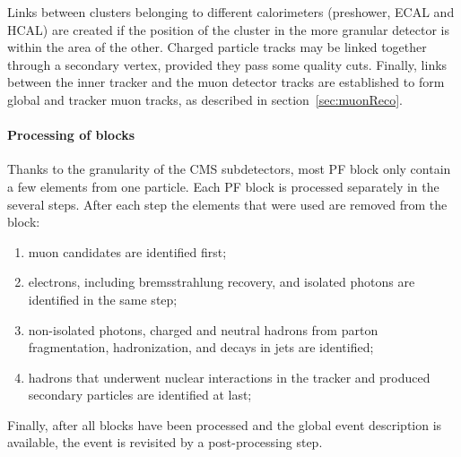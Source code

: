 Links between clusters belonging to different calorimeters (preshower, ECAL and HCAL) are created if the position of the cluster in the more granular detector is within the area of the other.
Charged particle tracks may be linked together through a secondary vertex, provided they pass some quality cuts.
Finally, links between the inner tracker and the muon detector tracks are established to form global and tracker muon tracks, as described in section~\ref{sec:muonReco}.

\paragraph{Processing of blocks\\}

Thanks to the granularity of the CMS subdetectors, most PF block only contain a few elements from one particle.
Each PF block is processed separately in the several steps. After each step the elements that were used are removed from the block:
\begin{enumerate}
\item muon candidates are identified first;
\item electrons, including bremsstrahlung recovery, and isolated photons are identified in the same step;
\item non-isolated photons, charged and neutral hadrons from parton fragmentation, hadronization, and decays in jets are identified;
\item hadrons that underwent nuclear interactions in the tracker and produced secondary particles are identified at last;
\end{enumerate}
Finally, after all blocks have been processed and the global event description is available, the event is revisited by a post-processing step.
